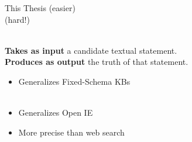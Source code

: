 \begin{frame}{This Thesis}
 (easier) \\
 (hard!)  \\
\vspace{2ex}
\pause

 \\
\hspace{2ex}\textbf{Takes as input} a candidate textual statement. \\
\hspace{2ex}\textbf{Produces as output} the truth of that statement. \\
\vspace{1ex}
\pause

\begin{itemize}
\item Generalizes Fixed-Schema KBs \\
       \\
\pause
\item Generalizes Open IE \\
\pause
\item More precise than web search \\
\end{itemize}




\end{frame}
